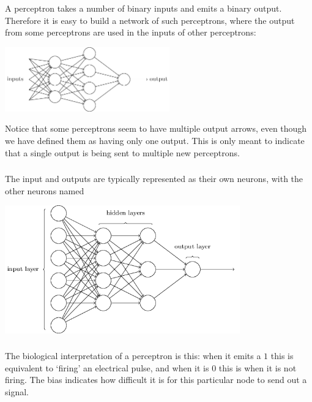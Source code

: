 \documentclass[xetex,mathserif,serif,aspectratio=169]{beamer}
\begin{document}
\begin{frame}[fragile] \frametitle{} \oldB \small


A perceptron takes a number of binary inputs and emits a binary output.
Therefore it is easy to build a network of such perceptrons, where the
output from some perceptrons are used in the inputs of other perceptrons:
\begin{center}
\includegraphics[width=2.8in]{img/tikz1.png}
\end{center}
Notice that some perceptrons seem to have multiple output arrows, even
though we have defined them as having only one output. This is only
meant to indicate that a single output is being sent to multiple new
perceptrons.

\end{frame}

\begin{frame}[fragile] \frametitle{} \oldB \small


The input and outputs are typically represented as their own neurons,
with the other neurons named 
\begin{center}
\includegraphics[width=4in]{img/tikz11.png}
\end{center}

\end{frame}

\begin{frame}[fragile] \frametitle{} \oldB \small


The biological interpretation of a perceptron is this: when it
emits a $1$ this is equivalent to `firing' an electrical pulse,
and when it is $0$ this is when it is not firing. The bias
indicates how difficult it is for this particular node to
send out a signal.

\end{frame}
\end{document}
